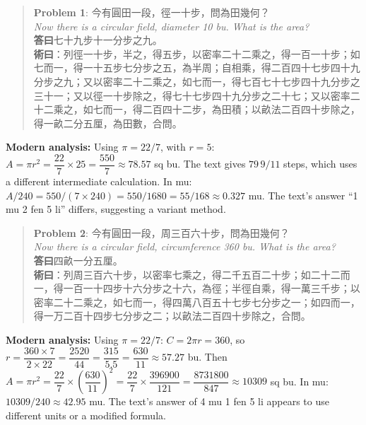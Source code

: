 \documentclass[11pt,a4paper]{article}
\newenvironment{vol3problembox}{%
  \begin{quote}
  \itshape
  \color{vol3color}
}{%
  \end{quote}
}
\begin{document}
\begin{vol3problembox}
\textbf{Problem 1}: 今有圓田一段，徑一十步，問為田幾何？\\[0.2cm]
\textit{Now there is a circular field, diameter 10 bu. What is the area?}\\[0.2cm]
\textbf{答曰}七十九步十一分步之九。\\[0.2cm]
\textbf{術曰}：列徑一十步，半之，得五步，以密率二十二乘之，得一百一十步；如七而一，得一十五步七分步之五，為半周；自相乘，得二百四十七步四十九分步之九；又以密率二十二乘之，如七而一，得七百七十七步四十九分步之三十一；又以徑一十步除之，得七十七步四十九分步之二十七；又以密率二十二乘之，如七而一，得二百四十二步，為田積；以畝法二百四十步除之，得一畝二分五厘，為田數，合問。
\end{vol3problembox}

\textbf{Modern analysis:} Using $\pi = 22/7$, with $r = 5$: $A = \pi r^2 = \dfrac{22}{7} \times 25 = \dfrac{550}{7} \approx 78.57$ sq bu. The text gives $79\,9/11$ steps, which uses a different intermediate calculation. In mu: $A/240 = 550/(7 \times 240) = 550/1680 = 55/168 \approx 0.327$ mu. The text's answer ``1 mu 2 fen 5 li'' differs, suggesting a variant method.

\vspace{0.3cm}

\begin{vol3problembox}
\textbf{Problem 2}: 今有圓田一段，周三百六十步，問為田幾何？\\[0.2cm]
\textit{Now there is a circular field, circumference 360 bu. What is the area?}\\[0.2cm]
\textbf{答曰}四畝一分五厘。\\[0.2cm]
\textbf{術曰}：列周三百六十步，以密率七乘之，得二千五百二十步；如二十二而一，得一百一十四步十六分步之十六，為徑；半徑自乘，得一萬三千步；以密率二十二乘之，如七而一，得四萬八百五十七步七分步之一；如四而一，得一万二百十四步七分步之二；以畝法二百四十步除之，合問。
\end{vol3problembox}

\textbf{Modern analysis:} Using $\pi = 22/7$: $C = 2\pi r = 360$, so $r = \dfrac{360 \times 7}{2 \times 22} = \dfrac{2520}{44} = \dfrac{315}{5.5} = \dfrac{630}{11} \approx 57.27$ bu. Then $A = \pi r^2 = \dfrac{22}{7} \times \left(\dfrac{630}{11}\right)^2 = \dfrac{22}{7} \times \dfrac{396900}{121} = \dfrac{8731800}{847} \approx 10309$ sq bu. In mu: $10309/240 \approx 42.95$ mu. The text's answer of 4 mu 1 fen 5 li appears to use different units or a modified formula.
\end{document}
